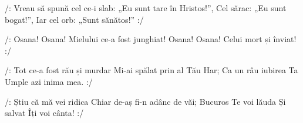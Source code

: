 \beginverse
/: Vreau să spună cel ce-i slab:
„Eu sunt tare în Hristos!”,
Cel sărac: „Eu sunt bogat!”,
Iar cel orb: „Sunt sănătos!” :/
\endverse

\beginchorus
/: Osana! Osana!
Mielului ce-a fost junghiat!
Osana! Osana!
Celui mort și înviat! :/
\endchorus

\beginverse
/: Tot ce-a fost rău și murdar
Mi-ai spălat prin al Tău Har;
Ca un râu iubirea Ta
Umple azi inima mea. :/
\endverse

\beginverse
/: Știu că mă vei ridica
Chiar de-aș fi-n adânc de văi;
Bucuros Te voi lăuda
Și salvat Îți voi cânta! :/
\endverse
\endsong